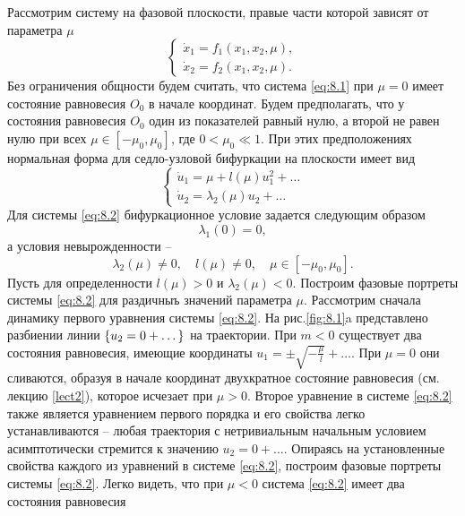 Рассмотрим систему на фазовой плоскости, правые части которой зависят от параметра $\mu$
 \begin{equation}
        \label{eq:8.1}
        \begin{cases}
                \dot x_1 = f_1(x_1,x_2,\mu),\\
                \dot x_2 = f_2(x_1,x_2,\mu). 
        \end{cases}
\end{equation}
Без ограничения общности будем считать, что система \eqref{eq:8.1} при $\mu=0$ имеет
состояние равновесия $O_0$ в начале координат. Будем предполагать, что у
состояния равновесия $O_0$ один из показателей равный нулю, а второй не равен
нулю при всех $\mu \in [-\mu_0,\mu_0]$, где $0<\mu_0\ll 1$.
 При этих предположениях
нормальная форма для седло-узловой бифуркации на плоскости имеет вид
\begin{equation}
        \label{eq:8.2}
        \begin{cases}
           \dot u_1 = \mu + l(\mu) u_1^2 + \dots\\
           \dot u_2 = \lambda_2(\mu) u_2 + \dots 
        \end{cases}
\end{equation}
Для системы \eqref{eq:8.2} бифуркационное условие задается следующим образом
\begin{equation}
        \label{eq:8.3}
        \lambda_1(0)=0,
\end{equation}
а условия невырожденности --
\begin{equation}
        \label{eq:8.4}
        \lambda_2(\mu) \neq 0, \quad l(\mu) \neq 0, \quad \mu \in [-\mu_0,\mu_0].
\end{equation}
Пусть для определенности $l( \mu) > 0$ и $\lambda_2(\mu)<0$. Построим фазовые портреты системы \eqref{eq:8.2} для раздичныъ значений параметра $\mu$. Рассмотрим сначала динамику первого уравнения 
системы \eqref{eq:8.2}. На рис.\ref{fig:8.1}a представлено разбиении линии $\qty{ u_2= 0+ \dots}$ на траектории. При $m<0$ существует два состояния равновесия, имеющие координаты $u_1 = \pm \sqrt{- \frac{\mu}{l}} + \dots$. При $\mu=0$ они сливаются, образуя в начале координат двухкратное состояние
равновесия (см. лекцию \ref{lect2}), которое исчезает при $\mu>0$. Второе уравнение в системе \eqref{eq:8.2} также является уравнением первого порядка и его свойства легко устанавливаются -- любая траектория с нетривиальным начальным условием асимптотически стремится к значению $u_2=0+\dots$. Опираясь на установленные свойства каждого из уравнений в системе \eqref{eq:8.2}, построим фазовые портреты системы \eqref{eq:8.2}. Легко видеть, что при $\mu<0$ система \eqref{eq:8.2} имеет два состояния равновесия
